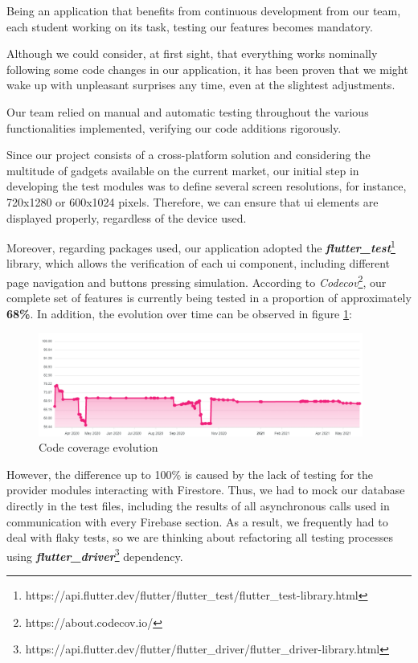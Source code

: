     Being an application that benefits from continuous development from our team, each student working on its task, testing our features becomes mandatory.
    
    Although we could consider, at first sight, that everything works nominally following some code changes in our application, it has been proven that we might wake up with unpleasant surprises any time, even at the slightest adjustments.
    
    Our team relied on manual and automatic testing throughout the various functionalities implemented, verifying our code additions rigorously.
    
    Since our project consists of a cross-platform solution and considering the multitude of gadgets available on the current market, our initial step in developing the test modules was to define several screen resolutions, for instance, 720x1280 or 600x1024 pixels. Therefore, we can ensure that \acrshort{ui} elements are displayed properly, regardless of the device used.
    
    Moreover, regarding packages used, our application adopted the \textbf{\textit{flutter\_test}}\footnote{https://api.flutter.dev/flutter/flutter\_test/flutter\_test-library.html} library, which allows the verification of each \acrshort{ui} component, including different page navigation and buttons pressing simulation. According to \textit{Codecov}\footnote{https://about.codecov.io/}, our complete set of features is currently being tested in a proportion of approximately \textbf{68\%}. In addition, the evolution over time can be observed in figure \ref{5:fig:codecov}:
    
    \begin{figure}[!ht]
        \centering
         \includegraphics[width=0.95\textwidth]{figures/charts/codecov.png}
         \caption{Code coverage evolution}
        \label{5:fig:codecov}
    \end{figure}
    
    However, the difference up to 100\% is caused by the lack of testing for the provider modules interacting with Firestore. Thus, we had to mock our database directly in the test files, including the results of all asynchronous calls used in communication with every Firebase section. As a result, we frequently had to deal with flaky tests, so we are thinking about refactoring all testing processes using \textbf{\textit{flutter\_driver}}\footnote{https://api.flutter.dev/flutter/flutter\_driver/flutter\_driver-library.html} dependency.
    
    
